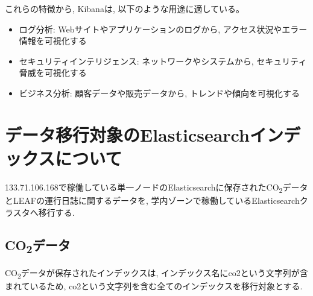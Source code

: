 これらの特徴から, Kibanaは, 以下のような用途に適している。

\begin{itemize}
  \item ログ分析: Webサイトやアプリケーションのログから, アクセス状況やエラー情報を可視化する
  \item セキュリティインテリジェンス: ネットワークやシステムから, セキュリティ脅威を可視化する
  \item ビジネス分析: 顧客データや販売データから, トレンドや傾向を可視化する
\end{itemize}




\section{データ移行対象のElasticsearchインデックスについて}

133.71.106.168で稼働している単一ノードのElasticsearchに保存されたCO\textsubscript{2}データとLEAFの運行日誌に関するデータを, 学内ゾーンで稼働しているElasticsearchクラスタへ移行する.

\subsection{CO\textsubscript{2}データ}

CO\textsubscript{2}データが保存されたインデックスは, インデックス名にco2という文字列が含まれているため, co2という文字列を含む全てのインデックスを移行対象とする.


